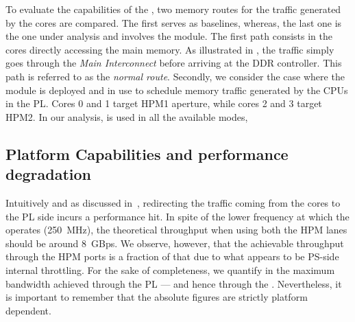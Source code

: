 
To evaluate the capabilities of the \schim, two memory routes for
the traffic generated by the cores are compared. The first serves
as baselines, whereas, the last one is the one under analysis and
involves the \schim module.  The first path consists in the cores
directly accessing the main memory. As illustrated in
, the traffic simply goes through the
\emph{Main Interconnect} before arriving at the DDR controller. This
path is referred to as the \emph{normal route}.
Secondly, we consider the case where the \schim module is deployed and in
use to schedule memory traffic generated by the CPUs in the PL. Cores
0 and 1 target HPM1 aperture, while cores 2 and 3 target HPM2. In our
analysis, \schim is used in all the available modes, 

\subsection{Platform Capabilities and performance degradation}
\label{subsec:platform-capabilities-and-performance-degradation}
Intuitively and as discussed in~\cite{PLIM20}, redirecting the traffic
coming from the cores to the PL side incurs a performance hit. In
spite of the lower frequency at which the \schim operates (250~MHz),
the theoretical throughput when using both the HPM lanes should be
around 8~GBps. We observe, however, that the achievable throughput
through the HPM ports is a fraction of that due to what appears to be
PS-side internal throttling. For the sake of completeness, we quantify
in  the maximum bandwidth achieved
through the PL --- and hence through the \schim. Nevertheless, it is
important to remember that the absolute figures are strictly platform
dependent.

